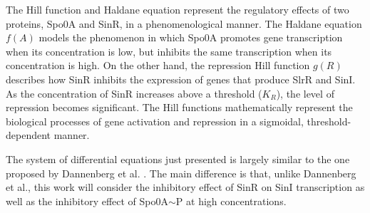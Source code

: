 The Hill function and Haldane equation represent the regulatory effects of two proteins, Spo0A and SinR, 
in a phenomenological manner.
 The Haldane equation \( f(A) \) models the phenomenon in which Spo0A promotes gene transcription
 when its concentration is low, but inhibits the same transcription when its concentration is high.
  On the other hand, the repression Hill function \( g(R) \) describes how SinR 
  inhibits the expression of genes that produce SlrR and SinI.
   As the concentration of SinR increases above a threshold ($K_R$), the level 
   of repression becomes significant. The Hill functions mathematically represent the biological
    processes of gene activation and repression in a sigmoidal, threshold-dependent manner.

The system of differential equations just presented is largely similar to the one proposed by Dannenberg et al. {\footnotesize\cite{simon}}. 
The main difference is that, unlike Dannenberg et al., 
this work will consider the inhibitory effect of SinR on SinI transcription as well as the inhibitory effect of
Spo0A$\sim$P at high concentrations.

